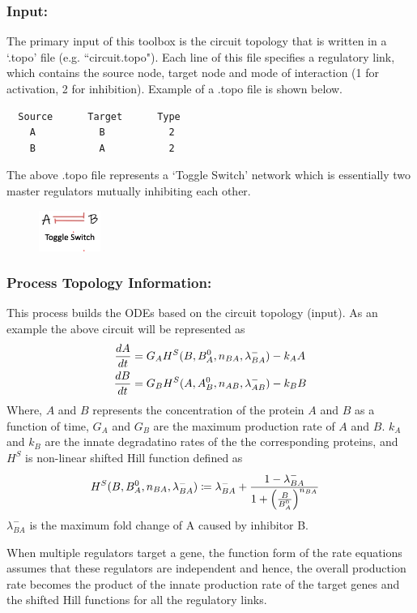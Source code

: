 \documentclass{article}
\begin{document}
\subsubsection*{Input:} The primary input of this toolbox is the circuit
topology that is written in a `.topo' file (e.g. ``circuit.topo"). Each line 
of this file specifies a regulatory link, which contains the source node, 
target node and mode of interaction (1 for activation, 2 for inhibition).
Example of a .topo file is shown below.
\begin{verbatim}
  Source      Target      Type 
    A           B           2
    B           A           2
\end{verbatim}
The above .topo file represents a `Toggle Switch' network which is essentially
two master regulators mutually inhibiting each other.
\begin{figure}[H]
  \centering
  \includegraphics[width=20mm, scale=0.5]{toggle_switch_logo.png}
\end{figure}

\subsubsection*{Process Topology Information:} This process builds 
the ODEs based on the circuit topology (input). As an example the above circuit 
will be represented as 
\begin{align}
  \frac{dA}{dt} &= G_A H^S (B, B_A^0, n_{BA}, \lambda^{-}_{BA}) - k_A A \notag \\
  \frac{dB}{dt} &= G_B H^S (A, A_B^0, n_{AB}, \lambda^{-}_{AB}) - k_B B \notag 
\end{align}
Where, $A$ and $B$ represents the concentration of the protein $A$ and $B$ as  
a function of time, $G_A$ and $G_B$ are the maximum production rate of $A$ and 
$B$. $k_A$ and $k_B$ are the innate degradatino rates of the the corresponding 
proteins, and $H^S$ is non-linear shifted Hill function defined as
\begin{align}
  H^S (B, B_A^0, n_{BA}, \lambda^{-}_{BA}) & \coloneqq  \lambda^{-}_{BA} +
   \frac{1 -\lambda^{-}_{BA}}{1 + \left( \frac{B}{B_A^0}\right)^{n_{BA}}}
   \notag
\end{align} 
$\lambda^{-}_{BA}$ is the maximum fold change of A caused by inhibitor B. 

When multiple regulators target a gene, the function form of the rate equations 
assumes that these regulators are independent and hence, the overall production
rate becomes the product of the innate production rate of the target genes and 
the shifted Hill functions for all the regulatory links. 
\end{document}
